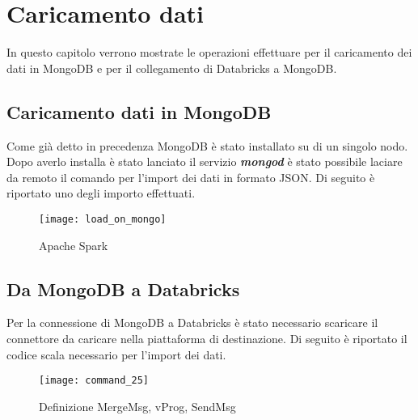 
\chapter{Caricamento dati}
In questo capitolo verrono mostrate le operazioni effettuare per il caricamento
dei dati in MongoDB e per il collegamento di Databricks a MongoDB.

\section{Caricamento dati in MongoDB}
Come già detto in precedenza MongoDB è stato installato su di un singolo nodo.
Dopo averlo installa è stato lanciato il servizio \textbf{\textit{mongod}} è stato
possibile laciare da remoto il comando per l'import dei dati in formato JSON.
Di seguito è riportato uno degli importo effettuati.

\begin{figure}[!htbp]
	\texttt{[image: load\_on\_mongo]}
  \caption{Apache Spark}
  \label{}
\end{figure}
\clearpage

\section{Da MongoDB a Databricks}

Per la connessione di MongoDB a Databricks è stato necessario scaricare il connettore
da caricare nella piattaforma di destinazione. Di seguito è riportato il codice
scala necessario per l'import dei dati.

\begin{figure}[!htbp]
  \texttt{[image: command\_25]}
  \caption{Definizione MergeMsg, vProg, SendMsg}
  \label{command_25}
\end{figure}
